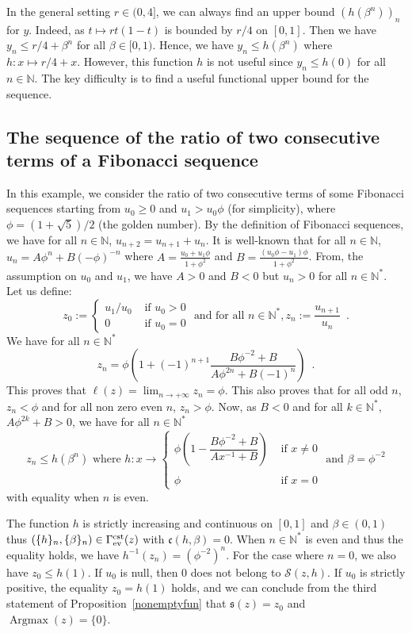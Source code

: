 \documentclass{article}
\def\valu#1{\mathfrak{s}(#1)}
\def\ls#1{\boldsymbol{\ell}(#1)}
\def\funset{\Gamma}
\def\fcste{\funset_{{\rm ev}}^{\rm cst}}
\def\cst{\mathfrak{c}}
\def\nn{\mathbb N}
\def\agmx{\operatorname{Argmax}}
\def\res{\mathcal{S}}
\def\red#1{#1}
\def\blue#1{#1}
\begin{document}
		In the general setting $r\in (0,4]$, we can always find an upper bound $(h(\beta^n))_n$ for $y$. Indeed, as $t\mapsto rt(1-t)$ is bounded by $r/4$ on $[0,1]$. Then we have $y_n\leq r/4+\beta^n$ for all $\beta\in [0,1)$. Hence, we have $y_n\leq h(\beta^n)$ where $h:x\mapsto r/4+x$. However, this function $h$ is not useful since $y_n\leq h(0)$ for all $n\in\nn$. The key difficulty is to find a useful functional upper bound \red{for} the sequence. 
		
		\subsection{The sequence of the ratio of two consecutive terms of a Fibonacci sequence}
		In this example, we consider the ratio \blue{of two consecutive terms} of some Fibonacci sequences starting from $u_0\geq 0$ and $u_1>u_0\phi$ (for simplicity), where $\phi=(1+\sqrt{5})/2$ (the golden number). By the definition of Fibonacci sequences, we have for all $n\in\nn$, $u_{n+2}=u_{n+1}+u_n$. It is well-known that for all $n\in\nn$, $u_n=A\phi^n+B(-\phi)^{-n}$ where $A=\frac{u_0+u_1\phi}{1+\phi^2}$ and 
		$B=\frac{(u_0\phi-u_1)\phi}{1+\phi^2}$. From, the assumption on $u_0$ and $u_1$, we have $A>0$ and $B<0$ but $u_n>0$ for all $n\in\nn^*$. Let us define:
		\[
		\blue{z}_0:=\left\{\begin{array}{lr}u_{1}/u_0 & \text{ if } u_0> 0\\
			0 & \text{ if } u_0=0\end{array}
		\right. \text{ and for all } n\in\nn^*, \blue{z}_n:=\dfrac{u_{n+1}}{u_n} \enspace .
		\]
		We have for all $n\in\nn^*$
		\[
		\blue{z}_n=\phi\left(1+\red{(-1)^{n+1}\frac{B\phi^{-2}+B}{A\phi^{2n}+B(-1)^n}}\right)\enspace .
		\]
		This proves that $\ls{\blue{z}}=\lim_{n\to +\infty} \blue{z}_n=\phi$. This also proves that for all odd $n$, $\blue{z}_n<\phi$ and for all \red{non zero even} $n$, $\blue{z}_n>\phi$. Now, as $B<0$ \blue{and for all $k\in\nn^*$, $A\phi^{2k}+B>0$}, we have for all $n\in\nn^*$
		\[
		\blue{z}_n\leq h(\beta^n)\text{ where } h:x \to \left\{\begin{array}{lr}\phi\left(1-\dfrac{B\phi^{-2}+B}{Ax^{-1}+B}\right) & \text{ if } x\neq 0\\ \\ \phi & \text{ if } x=0\end{array}\right. \text{ and }\beta=\phi^{-2}
		\] 
		with equality when $n$ is even. 
		
		The function $h$ is strictly increasing and continuous on $[0,1]$ and $\beta\in (0,1)$  thus \blue{$(\{h\}_n,\{\beta\}_n)\in\fcste(\blue{z})$ with $\cst(h,\beta)=0$}. When $n\in\nn^*$ is even and thus the equality holds, we have $h^{-1}(\blue{z}_n)=(\phi^{-2})^n$. For the case where $n=0$, we also have $\blue{z}_0\leq h(1)$. If $u_0$ is null, \blue{then } $0$ does not belong to $\res(\blue{z},h)$. If $u_0$ is strictly positive, the equality $\blue{z}_0=h(1)$ holds, and we can conclude from the third statement of Proposition~\ref{nonemptyfun} that $\valu{\blue{z}}=\blue{z}_0$ and $\agmx(\blue{z})=\{0\}$.
		
\end{document}
